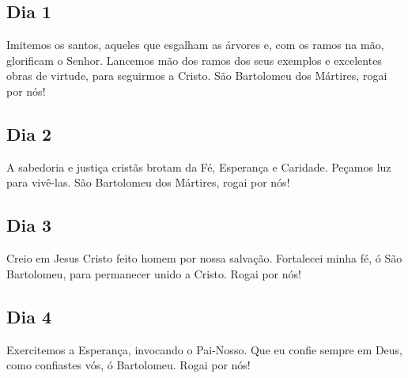 \documentclass[18pt]{article}
\begin{document}
\begin{justify}


\begin{center}
  \subsection*{Dia 1}
\end{center}


Imitemos os santos, aqueles que esgalham as árvores e, com os ramos na mão, glorificam o Senhor. Lancemos mão dos ramos dos seus exemplos e excelentes obras de virtude, para seguirmos a Cristo. São Bartolomeu dos Mártires, rogai por nós!

\begin{center}
  \subsection*{Dia 2}
\end{center}


A sabedoria e justiça cristãs brotam da Fé, Esperança e Caridade. Peçamos luz para vivê-las. São Bartolomeu dos Mártires, rogai por nós!

\begin{center}
  \subsection*{Dia 3}
\end{center}


Creio em Jesus Cristo feito homem por nossa salvação. Fortalecei minha fé, ó São Bartolomeu, para permanecer unido a Cristo. Rogai por nós!

\begin{center}
  \subsection*{Dia 4}
\end{center}


Exercitemos a Esperança, invocando o Pai-Nosso. Que eu confie sempre em Deus, como confiastes vós, ó Bartolomeu. Rogai por nós!


\end{justify}
\end{document}
